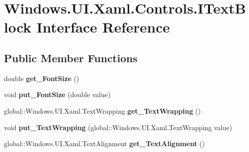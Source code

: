 \hypertarget{interface_windows_1_1_u_i_1_1_xaml_1_1_controls_1_1_i_text_block}{}\section{Windows.\+U\+I.\+Xaml.\+Controls.\+I\+Text\+Block Interface Reference}
\label{interface_windows_1_1_u_i_1_1_xaml_1_1_controls_1_1_i_text_block}
\subsection*{Public Member Functions}
\begin{DoxyCompactItemize}
\item 
\mbox{\label{interface_windows_1_1_u_i_1_1_xaml_1_1_controls_1_1_i_text_block_a9912fea3536da888623b2947225a9d6d}} 
double {\bfseries get\+\_\+\+Font\+Size} ()
\item 
\mbox{\label{interface_windows_1_1_u_i_1_1_xaml_1_1_controls_1_1_i_text_block_a6bee3c5a6d60cdfb17958f446638701f}} 
void {\bfseries put\+\_\+\+Font\+Size} (double value)
\item 
\mbox{\label{interface_windows_1_1_u_i_1_1_xaml_1_1_controls_1_1_i_text_block_a912cc8618a3b0c565221ad7580825895}} 
global\+::\+Windows.\+U\+I.\+Xaml.\+Text\+Wrapping {\bfseries get\+\_\+\+Text\+Wrapping} ()
\item 
\mbox{\label{interface_windows_1_1_u_i_1_1_xaml_1_1_controls_1_1_i_text_block_a8b3ae1457755d87019558339b825f1df}} 
void {\bfseries put\+\_\+\+Text\+Wrapping} (global\+::\+Windows.\+U\+I.\+Xaml.\+Text\+Wrapping value)
\item 
\mbox{\label{interface_windows_1_1_u_i_1_1_xaml_1_1_controls_1_1_i_text_block_a830e1b11e0ae1ce7d5dfcacbb0034c62}} 
global\+::\+Windows.\+U\+I.\+Xaml.\+Text\+Alignment {\bfseries get\+\_\+\+Text\+Alignment} ()
\item 
\mbox{\label{interface_windows_1_1_u_i_1_1_xaml_1_1_controls_1_1_i_text_block_aec1946ac3a3d6391c36750affe93432d}} 

\end{DoxyCompactItemize}
